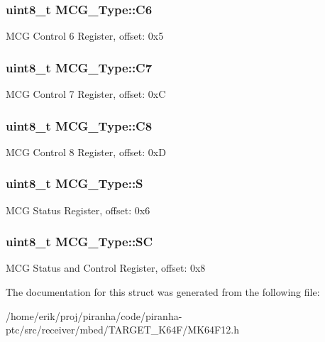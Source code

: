 \subsubsection[{\texorpdfstring{C6}{C6}}]{ uint8\+\_\+t M\+C\+G\+\_\+\+Type\+::\+C6}\hypertarget{structMCG__Type_a3739313253d53250920a429e3d9f8c9b}{}\label{structMCG__Type_a3739313253d53250920a429e3d9f8c9b}
M\+CG Control 6 Register, offset\+: 0x5 
\subsubsection[{\texorpdfstring{C7}{C7}}]{ uint8\+\_\+t M\+C\+G\+\_\+\+Type\+::\+C7}\hypertarget{structMCG__Type_a52920de03a5d8c8e4085ebf9f10aa5fd}{}\label{structMCG__Type_a52920de03a5d8c8e4085ebf9f10aa5fd}
M\+CG Control 7 Register, offset\+: 0xC 
\subsubsection[{\texorpdfstring{C8}{C8}}]{ uint8\+\_\+t M\+C\+G\+\_\+\+Type\+::\+C8}\hypertarget{structMCG__Type_ade4cb987285cb3307821b43d904adcb6}{}\label{structMCG__Type_ade4cb987285cb3307821b43d904adcb6}
M\+CG Control 8 Register, offset\+: 0xD 
\subsubsection[{\texorpdfstring{S}{S}}]{ uint8\+\_\+t M\+C\+G\+\_\+\+Type\+::S}\hypertarget{structMCG__Type_aa181a88ea541ca57f4c8402862d0860c}{}\label{structMCG__Type_aa181a88ea541ca57f4c8402862d0860c}
M\+CG Status Register, offset\+: 0x6 
\subsubsection[{\texorpdfstring{SC}{SC}}]{ uint8\+\_\+t M\+C\+G\+\_\+\+Type\+::\+SC}\hypertarget{structMCG__Type_a7fd146380faf9dd7da4763f061b26564}{}\label{structMCG__Type_a7fd146380faf9dd7da4763f061b26564}
M\+CG Status and Control Register, offset\+: 0x8 

The documentation for this struct was generated from the following file\+:\begin{DoxyCompactItemize}
\item 
/home/erik/proj/piranha/code/piranha-\/ptc/src/receiver/mbed/\+T\+A\+R\+G\+E\+T\+\_\+\+K64\+F/M\+K64\+F12.\+h\end{DoxyCompactItemize}
